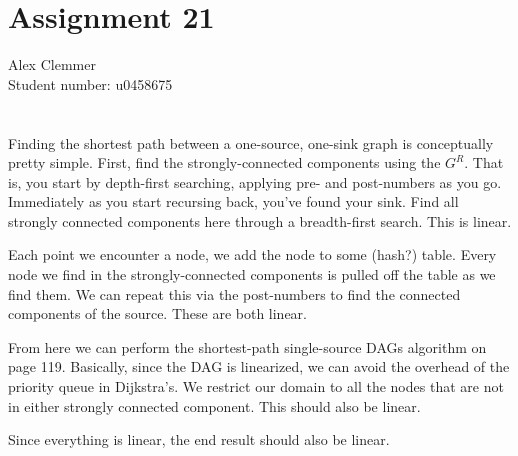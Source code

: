 \documentclass[a4paper]{article}
\begin{document}
\section*{Assignment 21}
Alex Clemmer\\
Student number: u0458675

\section*{}

Finding the shortest path between a one-source, one-sink graph is conceptually pretty simple. First, find the strongly-connected components using the $G^R$. That is, you start by depth-first searching, applying pre- and post-numbers as you go. Immediately as you start recursing back, you've found your sink. Find all strongly connected components here through a breadth-first search. This is linear.

Each point we encounter a node, we add the node to some (hash?) table. Every node we find in the strongly-connected components is pulled off the table as we find them. We can repeat this via the post-numbers to find the connected components of the source. These are both linear.

From here we can perform the shortest-path single-source DAGs algorithm on page 119. Basically, since the DAG is linearized, we can avoid the overhead of the priority queue in Dijkstra's. We restrict our domain to all the nodes that are not in either strongly connected component. This should also be linear.

Since everything is linear, the end result should also be linear.
\end{document}
